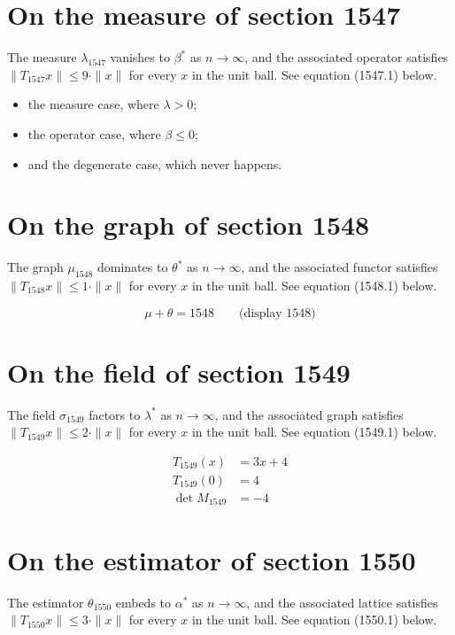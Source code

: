 \documentclass{article}
\begin{document}
\section{On the measure of section 1547}
The measure $\lambda_{1547}$ vanishes to $\beta^{*}$ as $n \to \infty$,
and the associated operator satisfies $\|T_{1547} x\| \leq 9 \cdot \|x\|$
for every $x$ in the unit ball. See equation (1547.1) below.

\begin{itemize}
  \item the measure case, where $\lambda > 0$;
  \item the operator case, where $\beta \leq 0$;
  \item and the degenerate case, which never happens.
\end{itemize}

\section{On the graph of section 1548}
The graph $\mu_{1548}$ dominates to $\theta^{*}$ as $n \to \infty$,
and the associated functor satisfies $\|T_{1548} x\| \leq 1 \cdot \|x\|$
for every $x$ in the unit ball. See equation (1548.1) below.

$$
\mu + \theta = 1548 \qquad \text{(display 1548)}
$$

\section{On the field of section 1549}
The field $\sigma_{1549}$ factors to $\lambda^{*}$ as $n \to \infty$,
and the associated graph satisfies $\|T_{1549} x\| \leq 2 \cdot \|x\|$
for every $x$ in the unit ball. See equation (1549.1) below.

\begin{align}
T_{1549}(x) &= 3 x + 4 \\
T_{1549}(0) &= 4 \\
\det M_{1549} &= -4
\end{align}

\section{On the estimator of section 1550}
The estimator $\theta_{1550}$ embeds to $\alpha^{*}$ as $n \to \infty$,
and the associated lattice satisfies $\|T_{1550} x\| \leq 3 \cdot \|x\|$
for every $x$ in the unit ball. See equation (1550.1) below.
\end{document}
